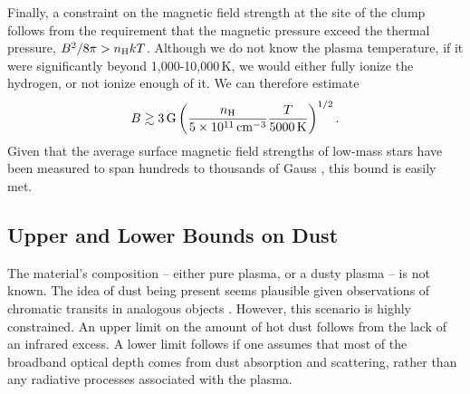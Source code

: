\documentclass{nature3}
\begin{document}
\begin{methods}
Finally, a constraint on the magnetic field strength at the site of
the clump follows from the requirement that the magnetic pressure
exceed the thermal pressure, $B^2 / 8\pi > n_{\rm H} k T$.  Although
we do not know the plasma temperature, if it were significantly beyond
1,000-10,000\,K, we would either fully ionize the hydrogen, or not
ionize enough of it.  We can therefore estimate
\begin{equation}
  B \gtrsim 3\,{\rm G}
  \left(
  \frac{n_{\rm H}}{5\times10^{11}\,{\rm cm}^{-3}}
  \frac{T}{5000\,{\rm K}}
  \right)^{1/2}.
\end{equation}
Given that the average surface magnetic field strengths of low-mass
stars have been measured to span hundreds to thousands of Gauss
\cite{Donati2009,Kochukhov2021,Reiners2022}, this bound is easily met.

\subsection{Upper and Lower Bounds on Dust}\phantom{+}
\label{subsec:dust}

The material's composition -- either pure plasma, or a dusty plasma --
is not known.  The idea of dust being present seems plausible given
observations of chromatic transits in analogous objects
\cite{Tanimoto2020,Gunther2022,Koen2023}.  However, this scenario is
highly constrained.  An upper limit on the amount of hot dust follows
from the lack of an infrared excess.  A lower limit follows if one
assumes that most of the broadband optical depth comes from dust
absorption and scattering, rather than any radiative processes
associated with the plasma.


\end{methods}
\end{document}
